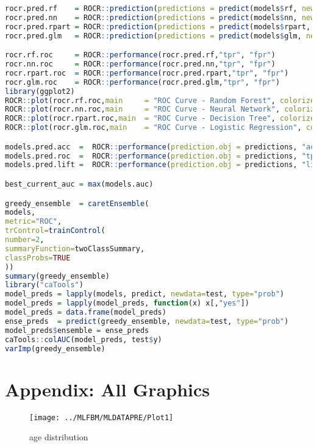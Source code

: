 \documentclass[12pt, a4paper, bibliography=totoc, english]{scrartcl}
\begin{document}
\begin{lstlisting}[language = R]
rocr.pred.rf    = ROCR::prediction(predictions = predict(models$rf, newdata = test, type = "prob")[,2], labels = test$y)
rocr.pred.nn    = ROCR::prediction(predictions = predict(models$nn, newdata = test, type = "prob")[,2], labels = test$y)
rocr.pred.rpart = ROCR::prediction(predictions = predict(models$rpart, newdata = test, type = "prob")[,2], labels = test$y)
rocr.pred.glm   = ROCR::prediction(predictions = predict(models$glm, newdata = test, type = "prob")[,2], labels = test$y)

rocr.rf.roc     = ROCR::performance(rocr.pred.rf,"tpr", "fpr")
rocr.nn.roc     = ROCR::performance(rocr.pred.nn,"tpr", "fpr")
rocr.rpart.roc  = ROCR::performance(rocr.pred.rpart,"tpr", "fpr")
rocr.glm.roc    = ROCR::performance(rocr.pred.glm,"tpr", "fpr")
library(ggplot2)
ROCR::plot(rocr.rf.roc,main     = "ROC Curve - Random Forest", colorize = T,  lwd=10)
ROCR::plot(rocr.nn.roc,main     = "ROC Curve - Neural Network", colorize = T,  lwd=10)
ROCR::plot(rocr.rpart.roc,main  = "ROC Curve - Decision Tree", colorize = T,  lwd=10)
ROCR::plot(rocr.glm.roc,main    = "ROC Curve - Logistic Regression", colorize = T,  lwd=10)

models.pred.acc  =  ROCR::performance(prediction.obj = predictions, "acc")
models.pred.roc  =  ROCR::performance(prediction.obj = predictions, "tpr", "fpr")
models.pred.lift =  ROCR::performance(prediction.obj = predictions, "lift")

best_current_auc = max(models.auc)

greedy_ensemble  = caretEnsemble(
models, 
metric="ROC",
trControl=trainControl(
number=2,
summaryFunction=twoClassSummary,
classProbs=TRUE
))
summary(greedy_ensemble)
library("caTools")
model_preds = lapply(models, predict, newdata=test, type="prob")
model_preds = lapply(model_preds, function(x) x[,"yes"])
model_preds = data.frame(model_preds)
ense_preds  = predict(greedy_ensemble, newdata=test, type="prob")
model_preds$ensemble = ense_preds
caTools::colAUC(model_preds, test$y)
varImp(greedy_ensemble)
\end{lstlisting}



\section{Appendix: All Graphics}

\begin{figure}
	\centering
	\texttt{[image: ../MLFBM/MLDATAPRE/Plot1]}
	\caption{age distribution}
	\label{fig:plot1}
\end{figure}
\end{document}
